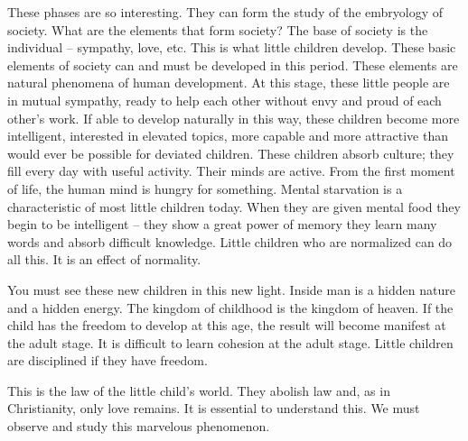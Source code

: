 \documentclass[lang=cn,10pt]{elegantbook}
\begin{document}
These phases are so interesting. They can form the study of the embryology of society. What are the elements that form society? The base of society is the individual – sympathy, love, etc. This is what little children develop. These basic elements of society can and must be developed in this period. These elements are natural phenomena of human development. At this stage, these little people are in mutual sympathy, ready to help each other without envy and proud of each other's work. If able to develop naturally in this way, these
children become more intelligent, interested in elevated topics, more capable and more attractive than would ever be possible for deviated children. These children absorb culture; they fill every day with useful activity. Their minds are active. From the first moment of life, the human mind is hungry for something. Mental starvation is a characteristic of most little children today. When they are given mental food they begin to be intelligent – they show a great power of memory they learn many words and absorb difficult knowledge. Little
children who are normalized can do all this. It is an effect of normality.

You must see these new children in this new light. Inside man is a hidden nature and a hidden energy. The kingdom of childhood is the kingdom of heaven. If the child has the freedom to develop at this age, the result will become manifest at the adult stage. It is difficult to learn cohesion at the adult stage. Little children are disciplined if they have freedom.

This is the law of the little child's world. They abolish law and, as in Christianity, only love remains. It is essential to understand this. We must observe and study this marvelous phenomenon.
\end{document}
